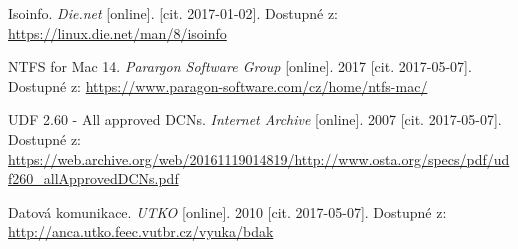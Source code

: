 \begin{literatura}{99}
    Isoinfo. \emph{Die.net} [online]. [cit. 2017-01-02]. Dostupné z: \url{https://linux.die.net/man/8/isoinfo}

    NTFS for Mac 14. \emph{Parargon Software Group} [online]. 2017 [cit. 2017-05-07]. Dostupné z: \url{https://www.paragon-software.com/cz/home/ntfs-mac/}

    UDF 2.60 - All approved DCNs. \emph{Internet Archive}\/ [online]. 2007 [cit. 2017-05-07]. Dostupné z: \url{https://web.archive.org/web/20161119014819/http://www.osta.org/specs/pdf/udf260_allApprovedDCNs.pdf}

    Datová komunikace. \emph{UTKO} [online]. 2010 [cit. 2017-05-07]. Dostupné z: \url{http://anca.utko.feec.vutbr.cz/vyuka/bdak}


\end{literatura}

